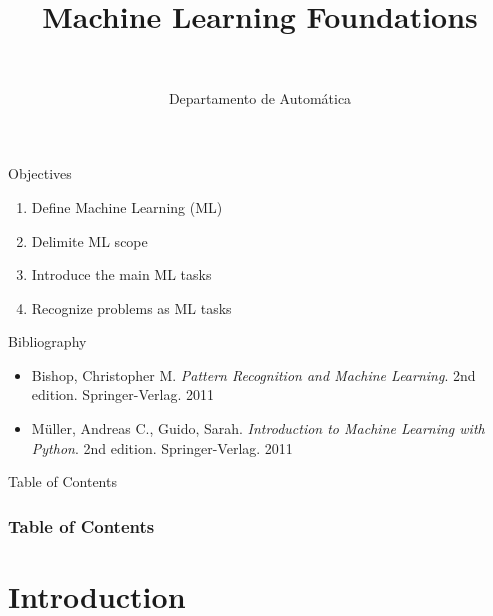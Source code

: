 \documentclass[10pt,compress]{beamer} %
\title[Machine Learning Foundations]{Machine Learning Foundations}
\author{\asignatura\\\carrera}
\institute{}
\date{Departamento de Automática}
\begin{document}
{\titlepageBlue
    \begin{frame}
        \titlepage
    \end{frame}
}

\begin{frame}[plain]{}
   \begin{block}{Objectives}
      \begin{enumerate}
         \item Define Machine Learning (ML)
		 \item Delimite ML scope
         \item Introduce the main ML tasks
         \item Recognize problems as ML tasks
      \end{enumerate} 
   \end{block}

   \begin{block}{Bibliography}
	\begin{itemize}
        \item Bishop, Christopher M. \textit{Pattern Recognition and Machine Learning}. 2nd edition. Springer-Verlag. 2011
        \item M\"uller, Andreas C., Guido, Sarah. \textit{Introduction to Machine Learning with Python}. 2nd edition. Springer-Verlag. 2011
	\end{itemize}
   \end{block}
\end{frame}

{
\begin{frame}[shrink]{Table of Contents}

 	\frametitle{Table of Contents}
  	\begin{multicols}{2}
  		\tableofcontents
    \end{multicols}

\end{frame}
}

\section{Introduction}
\end{document}
